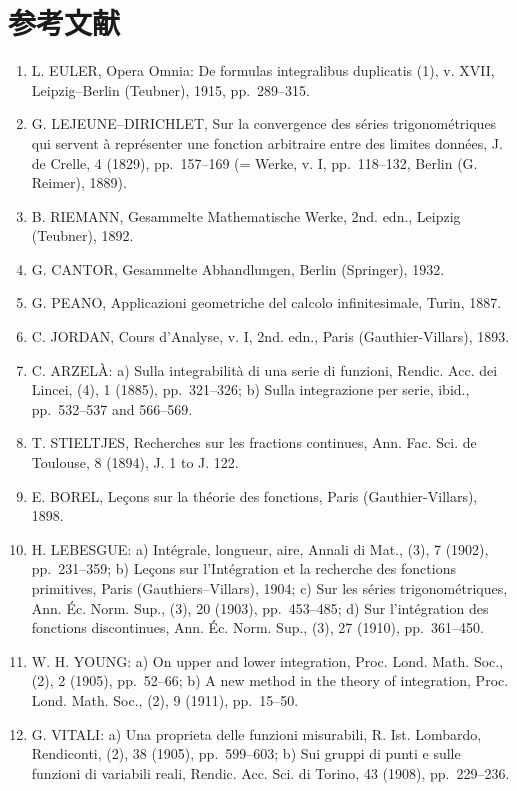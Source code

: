 \chapter*{参考文献}
{}

\begin{enumerate}
\def\labelenumi{(\Roman{enumi})}
\item
  L. EULER, Opera Omnia: De formulas integralibus duplicatis (1), v. XVII, Leipzig--Berlin (Teubner), 1915, pp.~289--315.
\item
  G. LEJEUNE--DIRICHLET, Sur la convergence des séries trigonométriques qui servent à représenter une fonction arbitraire entre des limites données, J. de Crelle, 4 (1829), pp.~157--169 (= Werke, v. I, pp.~118--132, Berlin (G. Reimer), 1889).
\item
  B. RIEMANN, Gesammelte Mathematische Werke, 2nd. edn., Leipzig (Teubner), 1892.
\item
  G. CANTOR, Gesammelte Abhandlungen, Berlin (Springer), 1932.
\item
  G. PEANO, Applicazioni geometriche del calcolo infinitesimale, Turin, 1887.
\item
  C. JORDAN, Cours d'Analyse, v. I, 2nd. edn., Paris (Gauthier-Villars), 1893.
\item
  C. ARZELÀ: a) Sulla integrabilità di una serie di funzioni, Rendic. Acc. dei Lincei, (4), 1 (1885), pp.~321--326; b) Sulla integrazione per serie, ibid., pp.~532--537 and 566--569.
\item
  T. STIELTJES, Recherches sur les fractions continues, Ann. Fac. Sci. de Toulouse, 8 (1894), J. 1 to J. 122.
\item
  E. BOREL, Leçons sur la théorie des fonctions, Paris (Gauthier-Villars), 1898.
\item
  H. LEBESGUE: a) Intégrale, longueur, aire, Annali di Mat., (3), 7 (1902), pp.~231--359; b) Leçons sur l'Intégration et la recherche des fonctions primitives, Paris (Gauthiers--Villars), 1904; c) Sur les séries trigonométriques, Ann. Éc. Norm. Sup., (3), 20 (1903), pp.~453--485; d) Sur l'intégration des fonctions discontinues, Ann. Éc. Norm. Sup., (3), 27 (1910), pp.~361--450.
\item
  W. H. YOUNG: a) On upper and lower integration, Proc. Lond. Math. Soc., (2), 2 (1905), pp.~52--66; b) A new method in the theory of integration, Proc. Lond. Math. Soc., (2), 9 (1911), pp.~15--50.
\item
  G. VITALI: a) Una proprieta delle funzioni misurabili, R. Ist. Lombardo, Rendiconti, (2), 38 (1905), pp.~599--603; b) Sui gruppi di punti e sulle funzioni di variabili reali, Rendic. Acc. Sci. di Torino, 43 (1908), pp.~229--236.

\end{enumerate}

